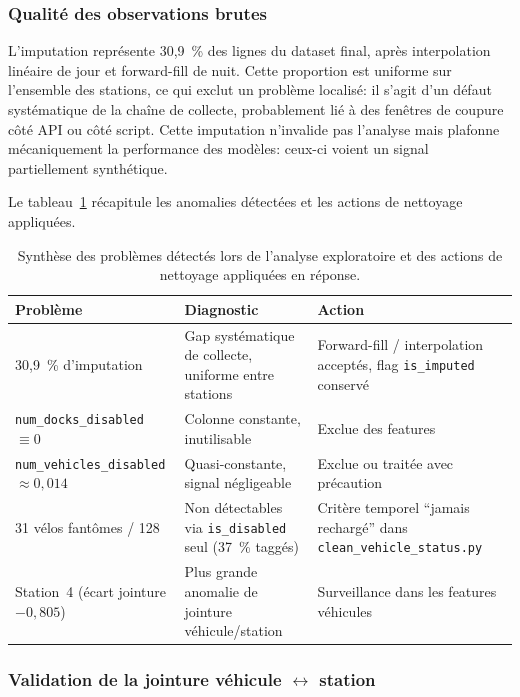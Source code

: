 \documentclass[fleqn, 12pt]{scrartcl}
\begin{document}
\subsubsection*{Qualité des observations brutes}

L'imputation représente 30{,}9~\% des lignes du dataset final, après interpolation linéaire de jour et forward-fill de nuit. Cette proportion est uniforme sur l'ensemble des stations, ce qui exclut un problème localisé: il s'agit d'un défaut systématique de la chaîne de collecte, probablement lié à des fenêtres de coupure côté API ou côté script. Cette imputation n'invalide pas l'analyse mais plafonne mécaniquement la performance des modèles: ceux-ci voient un signal partiellement synthétique.

\vspace{0.3cm}

Le tableau~\ref{tab:nettoyage} récapitule les anomalies détectées et les actions de nettoyage appliquées.

\begin{table}[htp]
\centering
\small
\begin{tabular}{p{4.2cm}p{5.5cm}p{4.5cm}}
\toprule
\textbf{Problème} & \textbf{Diagnostic} & \textbf{Action} \\
\midrule
30{,}9~\% d'imputation & Gap systématique de collecte, uniforme entre stations & Forward-fill / interpolation acceptés, flag \texttt{is\_imputed} conservé \\
\midrule
\texttt{num\_docks\_disabled} $\equiv 0$ & Colonne constante, inutilisable & Exclue des features \\
\midrule
\texttt{num\_vehicles\_disabled} $\approx 0{,}014$ & Quasi-constante, signal négligeable & Exclue ou traitée avec précaution \\
\midrule
31 vélos fantômes / 128 & Non détectables via \texttt{is\_disabled} seul (37~\% taggés) & Critère temporel ``jamais rechargé'' dans \texttt{clean\_vehicle\_status.py} \\
\midrule
Station~4 (écart jointure $-0{,}805$) & Plus grande anomalie de jointure véhicule/station & Surveillance dans les features véhicules \\
\bottomrule
\end{tabular}
\caption{Synthèse des problèmes détectés lors de l'analyse exploratoire et des actions de nettoyage appliquées en réponse.}%
\label{tab:nettoyage}
\end{table}

\subsubsection*{Validation de la jointure véhicule $\leftrightarrow$ station}
\end{document}
